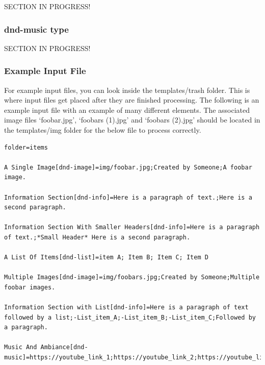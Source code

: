 SECTION IN PROGRESS!

\subsubsection{dnd-music type}

SECTION IN PROGRESS!

\subsubsection{Example Input File}

For example input files, you can look inside the templates/trash folder. This is where input files get placed after they are finished processing. The following is an example input file with an example of many different elements. The associated image files `foobar.jpg', `foobars (1).jpg' and `foobars (2).jpg' should be located in the templates/img folder for the below file to process correctly.

\begin{lstlisting}
folder=items

A Single Image[dnd-image]=img/foobar.jpg;Created by Someone;A foobar image.

Information Section[dnd-info]=Here is a paragraph of text.;Here is a second paragraph.

Information Section With Smaller Headers[dnd-info]=Here is a paragraph of text.;*Small Header* Here is a second paragraph.

A List Of Items[dnd-list]=item A; Item B; Item C; Item D

Multiple Images[dnd-image]=img/foobars.jpg;Created by Someone;Multiple foobar images.

Information Section with List[dnd-info]=Here is a paragraph of text followed by a list;-List_item_A;-List_item_B;-List_item_C;Followed by a paragraph.

Music And Ambiance[dnd-music]=https://youtube_link_1;https://youtube_link_2;https://youtube_link_3
\end{lstlisting}

